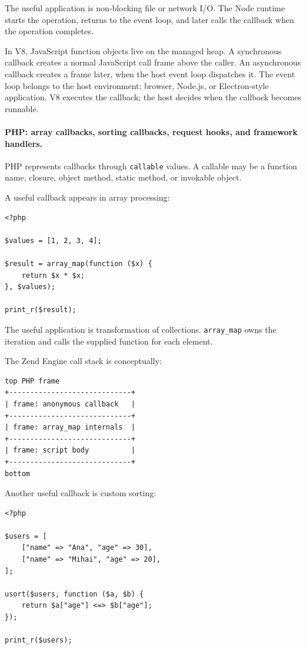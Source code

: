 The useful application is non-blocking file or network I/O. The Node runtime starts the operation, returns to the event loop, and later calls the callback when the operation completes.

In V8, JavaScript function objects live on the managed heap. A synchronous callback creates a normal JavaScript call frame above the caller. An asynchronous callback creates a frame later, when the host event loop dispatches it. The event loop belongs to the host environment: browser, Node.js, or Electron-style application. V8 executes the callback; the host decides when the callback becomes runnable.

\paragraph{PHP: array callbacks, sorting callbacks, request hooks, and framework handlers.}

PHP represents callbacks through \texttt{callable} values. A callable may be a function name, closure, object method, static method, or invokable object.

A useful callback appears in array processing:

\begin{verbatim}
<?php

$values = [1, 2, 3, 4];

$result = array_map(function ($x) {
    return $x * $x;
}, $values);

print_r($result);
\end{verbatim}

The useful application is transformation of collections. \texttt{array\_map} owns the iteration and calls the supplied function for each element.

The Zend Engine call stack is conceptually:

\begin{verbatim}
top PHP frame
+-----------------------------+
| frame: anonymous callback   |
+-----------------------------+
| frame: array_map internals  |
+-----------------------------+
| frame: script body          |
+-----------------------------+
bottom
\end{verbatim}

Another useful callback is custom sorting:

\begin{verbatim}
<?php

$users = [
    ["name" => "Ana", "age" => 30],
    ["name" => "Mihai", "age" => 20],
];

usort($users, function ($a, $b) {
    return $a["age"] <=> $b["age"];
});

print_r($users);
\end{verbatim}

